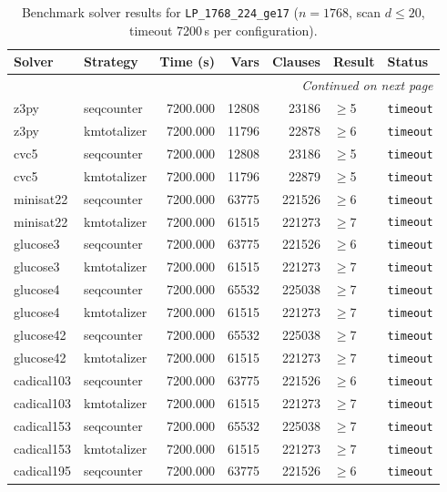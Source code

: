 \begin{longtable}{llrrrl p{}}
\caption{Benchmark solver results for \texttt{LP\_1768\_224\_ge17} ($n=1768$, scan $d \leq 20$, timeout 7200\,s per configuration).} \label{tab:bench-LP_1768_224_ge17} \\
\toprule
Solver & Strategy & Time (s) & Vars & Clauses & Result & Status \\
\midrule
\endhead
\midrule
\multicolumn{7}{r}{\textit{Continued on next page}} \\
\midrule
\endfoot
\bottomrule
\endlastfoot
z3py & seqcounter & 7200.000 & 12808 & 23186 & $\geq$5 & \texttt{timeout} \\
z3py & kmtotalizer & 7200.000 & 11796 & 22878 & $\geq$6 & \texttt{timeout} \\
cvc5 & seqcounter & 7200.000 & 12808 & 23186 & $\geq$5 & \texttt{timeout} \\
cvc5 & kmtotalizer & 7200.000 & 11796 & 22879 & $\geq$5 & \texttt{timeout} \\
minisat22 & seqcounter & 7200.000 & 63775 & 221526 & $\geq$6 & \texttt{timeout} \\
minisat22 & kmtotalizer & 7200.000 & 61515 & 221273 & $\geq$7 & \texttt{timeout} \\
glucose3 & seqcounter & 7200.000 & 63775 & 221526 & $\geq$6 & \texttt{timeout} \\
glucose3 & kmtotalizer & 7200.000 & 61515 & 221273 & $\geq$7 & \texttt{timeout} \\
glucose4 & seqcounter & 7200.000 & 65532 & 225038 & $\geq$7 & \texttt{timeout} \\
glucose4 & kmtotalizer & 7200.000 & 61515 & 221273 & $\geq$7 & \texttt{timeout} \\
glucose42 & seqcounter & 7200.000 & 65532 & 225038 & $\geq$7 & \texttt{timeout} \\
glucose42 & kmtotalizer & 7200.000 & 61515 & 221273 & $\geq$7 & \texttt{timeout} \\
cadical103 & seqcounter & 7200.000 & 63775 & 221526 & $\geq$6 & \texttt{timeout} \\
cadical103 & kmtotalizer & 7200.000 & 61515 & 221273 & $\geq$7 & \texttt{timeout} \\
cadical153 & seqcounter & 7200.000 & 65532 & 225038 & $\geq$7 & \texttt{timeout} \\
cadical153 & kmtotalizer & 7200.000 & 61515 & 221273 & $\geq$7 & \texttt{timeout} \\
cadical195 & seqcounter & 7200.000 & 63775 & 221526 & $\geq$6 & \texttt{timeout} \\

\end{longtable}
